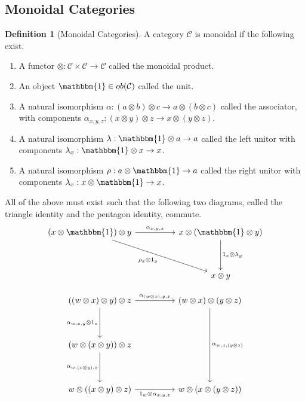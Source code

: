 \documentclass{article}
\theoremstyle{definition}
\newtheorem{definition}{Definition}
\begin{document}
\subsection*{Monoidal Categories}
\begin{definition}[Monoidal Categories]
    A category $\mathcal{C}$ is monoidal if the following exist.
    \begin{enumerate}
        \item A functor $\otimes:\mathcal{C}\times\mathcal{C}\rightarrow\mathcal{C}$ called the monoidal product.
        \item An object $\mathbbm{1}\in ob(\mathcal{C})$ called the unit.
        \item A natural isomorphism $\alpha : (a\otimes b)\otimes c\rightarrow a\otimes (b\otimes c)$ called the associator, with components $\alpha_{x,y,z}: (x\otimes y)\otimes z\rightarrow x\otimes (y\otimes z)$.
        \item A natural isomorphism $\lambda : \mathbbm{1}\otimes a\rightarrow a$ called the left unitor with components $\lambda_x : \mathbbm{1}\otimes x\rightarrow x$.
        \item A natural isomorphism $\rho : a\otimes \mathbbm{1}\rightarrow a$ called the right unitor with components $\lambda_x : x\otimes \mathbbm{1}\rightarrow x$.
    \end{enumerate}
    All of the above must exist such that the following two diagrams, called the triangle identity and the pentagon identity, commute.
    \[\begin{tikzcd}
            {(x\otimes\mathbbm{1})\otimes y} && {x\otimes(\mathbbm{1}\otimes y)} \\
            \\
            && {x\otimes y}
            \arrow["{{\rho_x\otimes 1_y}}"', from=1-1, to=3-3]
            \arrow["{{1_x\otimes\lambda_y}}", from=1-3, to=3-3]
            \arrow["{{\alpha_{x,y,z}}}", from=1-1, to=1-3]
        \end{tikzcd}\]

    \[\begin{tikzcd}
            {((w\otimes x)\otimes y)\otimes z} && {(w\otimes x)\otimes(y\otimes z)} \\
            \\
            {(w\otimes (x\otimes y))\otimes z} \\
            \\
            {w\otimes ((x\otimes y)\otimes z)} && {w\otimes (x\otimes (y\otimes z))}
            \arrow["{{\alpha_{w,x,(y\otimes z)}}}", from=1-3, to=5-3]
            \arrow["{{\alpha_{(w\otimes x),y,z}}}", from=1-1, to=1-3]
            \arrow["{{\alpha_{w,x,y}\otimes 1_z}}"', from=1-1, to=3-1]
            \arrow["{{\alpha_{w,(x\otimes y),z}}}"', from=3-1, to=5-1]
            \arrow["{{1_w\otimes \alpha_{x,y,z}}}"', from=5-1, to=5-3]
        \end{tikzcd}\]
\end{definition}


\color{black}
\nocite{*}

\pagebreak
\color{blue}


\end{document}
